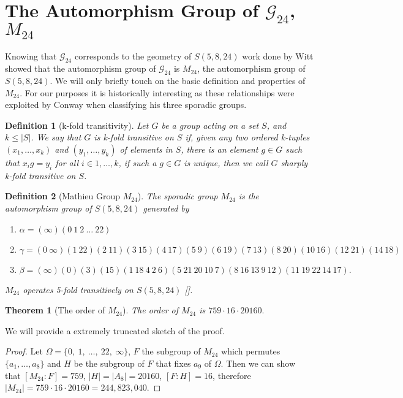 \documentclass[paper=a4, fontsize=11pt]{scrartcl} %
\numberwithin{equation}{section} %
\numberwithin{figure}{section} %
\numberwithin{table}{section} %
\theoremstyle{break}
\newtheorem{defn}{Definition}
\newtheorem{thm}{Theorem}
\begin{document}
\section{The Automorphism Group of $\mathcal{G}_{24}$, $M_{24}$}
Knowing that $\mathcal{G}_{24}$ corresponds to the geometry of $S(5,8,24)$ work done by Witt showed that the automorphism group of $\mathcal{G}_{24}$ is $M_{24}$, the automorphism group of $S(5,8,24)$. We will only briefly touch on the basic definition and properties of $M_{24}$. For our purposes it is historically interesting as these relationships were exploited by Conway when classifying his three sporadic groups.
\begin{defn}[k-fold transitivity]
Let $G$ be a group acting on a set $S$, and $k \leq |S|$. We say that $G$ is k-fold transitive on $S$ if, given any two ordered k-tuples $(x_1, \ldots , x_k)$ and $(y_1, \ldots, y_k)$ of elements in $S$, there is an element $g \in G$ such that $x_i g = y_i$ for all $i \in 1,\ldots , k$, if such a $g \in G$ is unique, then we call $G$ sharply k-fold transitive on $S$.
\end{defn}
\begin{defn}[Mathieu Group $M_{24}$]
The sporadic group $M_{24}$ is the automorphism group of $S(5,8,24)$ generated by
\begin{enumerate}
\item $\alpha = (\infty)(0 \: 1 \: 2 \: \ldots \: 22)$
\item $\gamma = (0 \: \infty)(1 \: 22)(2 \: 11)(3 \: 15)(4 \: 17)(5 \: 9)(6 \: 19)(7 \: 13)(8 \: 20)(10 \: 16)(12 \: 21)(14 \: 18)$
\item $\beta = (\infty)(0)(3)(15)(1 \: 18 \: 4 \: 2 \: 6)(5 \: 21 \: 20 \: 10 \: 7)(8 \: 16 \: 13 \: 9 \: 12)(11 \: 19 \: 22 \: 14 \: 17).$
\end{enumerate}
$M_{24}$ operates 5-fold transitively on $S(5,8,24)$ [\cite{conway}].
\end{defn}

\begin{thm}[The order of $M_{24}$]
The order of $M_{24}$ is $759 \cdot 16 \cdot 20160.$
\end{thm}

We will provide a extremely truncated sketch of the proof.
\begin{proof}
Let $\Omega = \{0, \: 1, \: \ldots, \: 22, \: \infty \}$, $F$ the subgroup of $M_{24}$ which permutes $\{ a_1, \ldots , a_8 \}$ and $H$ be the subgroup of $F$ that fixes $a_9$ of $\Omega$. Then we can show that $[M_{24} : F] = 759$, $|H| = |A_8| = 20160$, $[F:H] = 16$, therefore $|M_{24}| = 759 \cdot 16 \cdot 20160 = 244,823,040.$
\end{proof}
\end{document}
